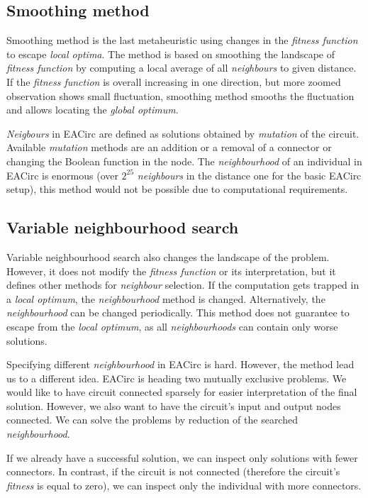 \documentclass[
    digital,    %
    oneside,    %
    color,
    11pt,
    nocover,
    notable,
    nolof,
    nolot,
]{fithesis3}
\begin{document}
\subsection{Smoothing method}
\label{subsec:opt-single-sol-smooth}

Smoothing method is the last metaheuristic using changes in the \textit{fitness function} to escape \textit{local optima}. The method is based on smoothing the landscape of \textit{fitness function} by computing a local average of all \textit{neighbours} to given distance. If the \textit{fitness function} is overall increasing in one direction, but more zoomed observation shows small fluctuation, smoothing method smooths the fluctuation and allows locating the \textit{global optimum}.

\textit{Neigbours} in EACirc are defined as solutions obtained by \textit{mutation} of the circuit. Available \textit{mutation} methods are an addition or a removal of a connector or changing the Boolean function in the node. The \textit{neighbourhood} of an individual in EACirc is enormous (over $2^{25}$ \textit{neighbours} in the distance one for the basic EACirc setup), this method would not be possible due to computational requirements.

\subsection{Variable neighbourhood search}
\label{subsec:opt-single-sol-vns}

Variable neighbourhood search also changes the landscape of the problem. However, it does not modify the \textit{fitness function} or its interpretation, but it defines other methods for \textit{neighbour} selection. If the computation gets trapped in a \textit{local optimum}, the \textit{neighbourhood} method is changed. Alternatively, the \textit{neighbourhood} can be changed periodically. This method does not guarantee to escape from the \textit{local optimum}, as all \textit{neighbourhoods} can contain only worse solutions.

Specifying different \textit{neighbourhood} in EACirc is hard. However, the method lead us to a different idea. EACirc is heading two mutually exclusive problems. We would like to have circuit connected sparsely for easier interpretation of the final solution. However, we also want to have the circuit's input and output nodes connected. We can solve the problems by reduction of the searched \textit{neighbourhood}.

If we already have a successful solution, we can inspect only solutions with fewer connectors. In contrast, if the circuit is not connected (therefore the circuit's \textit{fitness} is equal to zero), we can inspect only the individual with more connectors.
\end{document}
